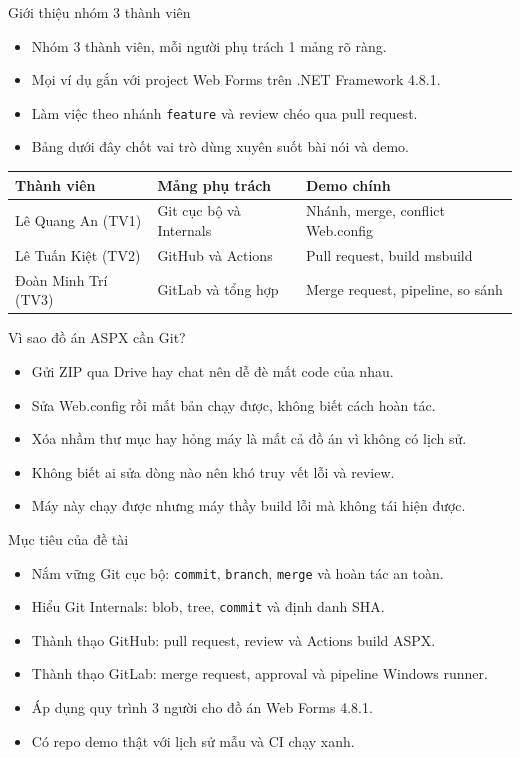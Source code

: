 \begin{frame}{Giới thiệu nhóm 3 thành viên}
\begin{itemize}
\item Nhóm 3 thành viên, mỗi người phụ trách 1 mảng rõ ràng.
\item Mọi ví dụ gắn với project Web Forms trên .NET Framework 4.8.1.
\item Làm việc theo nhánh \texttt{feature} và review chéo qua pull request.
\item Bảng dưới đây chốt vai trò dùng xuyên suốt bài nói và demo.
\end{itemize}
\begin{center}
\begin{tabular}{lll}
\toprule
Thành viên & Mảng phụ trách & Demo chính \\
\midrule
Lê Quang An (TV1) & Git cục bộ và Internals & Nhánh, merge, conflict Web.config \\
Lê Tuấn Kiệt (TV2) & GitHub và Actions & Pull request, build msbuild \\
Đoàn Minh Trí (TV3) & GitLab và tổng hợp & Merge request, pipeline, so sánh \\
\bottomrule
\end{tabular}
\end{center}
\end{frame}

\begin{frame}{Vì sao đồ án ASPX cần Git?}
\begin{itemize}
\item Gửi ZIP qua Drive hay chat nên dễ đè mất code của nhau.
\item Sửa Web.config rồi mất bản chạy được, không biết cách hoàn tác.
\item Xóa nhầm thư mục hay hỏng máy là mất cả đồ án vì không có lịch sử.
\item Không biết ai sửa dòng nào nên khó truy vết lỗi và review.
\item Máy này chạy được nhưng máy thầy build lỗi mà không tái hiện được.
\end{itemize}
\end{frame}

\begin{frame}{Mục tiêu của đề tài}
\begin{itemize}
\item Nắm vững Git cục bộ: \texttt{commit}, \texttt{branch}, \texttt{merge} và hoàn tác an toàn.
\item Hiểu Git Internals: blob, tree, \texttt{commit} và định danh SHA.
\item Thành thạo GitHub: pull request, review và Actions build ASPX.
\item Thành thạo GitLab: merge request, approval và pipeline Windows runner.
\item Áp dụng quy trình 3 người cho đồ án Web Forms 4.8.1.
\item Có repo demo thật với lịch sử mẫu và CI chạy xanh.
\end{itemize}
\end{frame}

